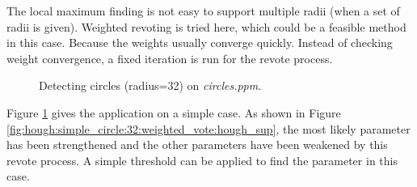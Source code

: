 \documentclass[paper=a4, fontsize=11pt]{scrartcl}
\numberwithin{equation}{section}		%
\numberwithin{figure}{section}			%
\begin{document}
The local maximum finding is not easy to support multiple radii (when a set of radii is given).
Weighted revoting is tried here, which could be a feasible method in this case.
Because the weights usually converge quickly.
Instead of checking weight convergence, a fixed iteration is run for the revote process.

\begin{figure}[h]
\centering
{}
\caption{Detecting circles (radius=32) on \emph{circles.ppm}.}
\label{fig:hough:simple_circle:32:weighted_vote}
\end{figure}

Figure \ref{fig:hough:simple_circle:32:weighted_vote} gives the application on a simple case. 
As shown in Figure \ref{fig:hough:simple_circle:32:weighted_vote:hough_sup}, the most likely parameter has been strengthened and the other parameters have been weakened by this revote process.
A simple threshold can be applied to find the parameter in this case.
\end{document}
